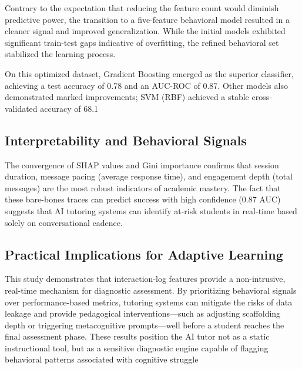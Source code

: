 \documentclass[conference]{IEEEtran}
\begin{document}
Contrary to the expectation that reducing the feature count would diminish predictive power, the transition to a five-feature behavioral model resulted in a cleaner signal and improved generalization. While the initial models exhibited significant train-test gaps indicative of overfitting, the refined behavioral set stabilized the learning process.


On this optimized dataset, Gradient Boosting emerged as the superior classifier, achieving a test accuracy of 0.78 and an AUC-ROC of 0.87. Other models also demonstrated marked improvements; SVM (RBF) achieved a stable cross-validated accuracy of 68.1%


\subsection{Interpretability and Behavioral Signals}

The convergence of SHAP values and Gini importance confirms that session duration, message pacing (average response time), and engagement depth (total messages) are the most robust indicators of academic mastery. The fact that these bare-bones traces can predict success with high confidence (0.87 AUC) suggests that AI tutoring systems can identify at-risk students in real-time based solely on conversational cadence.


\subsection{Practical Implications for Adaptive Learning}

This study demonstrates that interaction-log features provide a non-intrusive, real-time mechanism for diagnostic assessment. By prioritizing behavioral signals over performance-based metrics, tutoring systems can mitigate the risks of data leakage and provide pedagogical interventions—such as adjusting scaffolding depth or triggering metacognitive prompts—well before a student reaches the final assessment phase. These results position the AI tutor not as a static instructional tool, but as a sensitive diagnostic engine capable of flagging behavioral patterns associated with cognitive struggle


\end{document}
